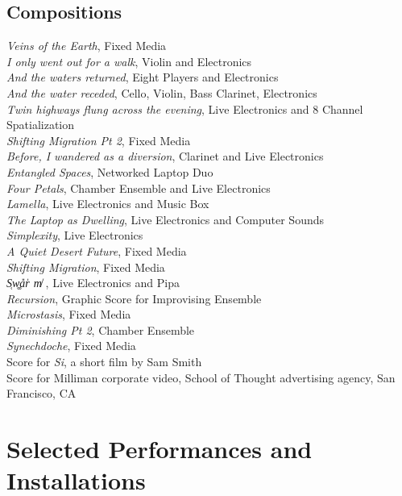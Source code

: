 \documentclass[10pt, a4paper]{article}
\newcommand{\years}[1]{\marginnote{\scriptsize #1}}
\begin{document}
\subsection*{Compositions}
\years{2024} 
\textit{Veins of the Earth}, Fixed Media \\
\years{2017}
\textit{I only went out for a walk}, Violin and Electronics\\
\textit{And the waters returned}, Eight Players and Electronics \\
\textit{And the water receded}, Cello, Violin, Bass Clarinet, Electronics \\
\years{2016} 
\textit{Twin highways flung across the evening}, Live Electronics and 8 Channel Spatialization \\
\textit{Shifting Migration Pt 2}, Fixed Media \\
\textit{Before, I wandered as a diversion}, Clarinet and Live Electronics\\
\textit{Entangled Spaces}, Networked Laptop Duo \\
\textit{Four Petals}, Chamber Ensemble and Live Electronics\\
\textit{Lamella}, Live Electronics and Music Box\\
\textit{The Laptop as Dwelling}, Live Electronics and Computer Sounds\\
\textit{Simplexity}, Live Electronics \\
\textit{A Quiet Desert Future}, Fixed Media\\
\textit{Shifting Migration}, Fixed Media \\
\years{2015}
\textit{S̜w͚a̎r̍  m̸}  , Live Electronics and Pipa\\  
\textit{Recursion}, Graphic Score for Improvising Ensemble \\  
\textit{Microstasis}, Fixed Media\\  
\textit{Diminishing Pt 2}, Chamber Ensemble \\  
\textit{Synechdoche}, Fixed Media \\  
Score for \textit{Si}, a short film by Sam Smith\\  
Score for Milliman corporate video, School of Thought advertising agency, San Francisco, CA\\  

\section*{Selected Performances and Installations}
\end{document}
